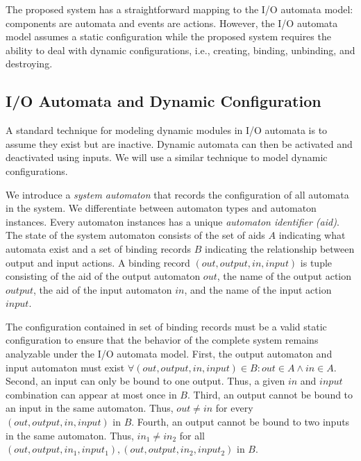 The proposed system has a straightforward mapping to the I/O automata model: components are automata and events are actions.
However, the I/O automata model assumes a static configuration while the proposed system requires the ability to deal with dynamic configurations, i.e., creating, binding, unbinding, and destroying.

\subsection{I/O Automata and Dynamic Configuration}

A standard technique for modeling dynamic modules in I/O automata is to assume they exist but are inactive.
Dynamic automata can then be activated and deactivated using inputs.
We will use a similar technique to model dynamic configurations.

We introduce a \emph{system automaton} that records the configuration of all automata in the system.
We differentiate between automaton types and automaton instances.
Every automaton instances has a unique \emph{automaton identifier (aid)}.
The state of the system automaton consists of the set of aids $A$ indicating what automata exist and a set of binding records $B$ indicating the relationship between output and input actions.
A binding record $(out, output, in, input)$ is tuple consisting of the aid of the output automaton $out$, the name of the output action $output$, the aid of the input automaton $in$, and the name of the input action $input$.

The configuration contained in set of binding records must be a valid static configuration to ensure that the behavior of the complete system remains analyzable under the I/O automata model.
First, the output automaton and input automaton must exist $\forall (out, output, in, input) \in B: out \in A \land in \in A$.
Second, an input can only be bound to one output.
Thus, a given $in$ and $input$ combination can appear at most once in $B$.
Third, an output cannot be bound to an input in the same automaton.
Thus, $out \neq in$ for every $(out, output, in, input)$ in $B$.
Fourth, an output cannot be bound to two inputs in the same automaton.
Thus, $in_1 \neq in_2$ for all $(out, output, in_1, input_1), (out, output, in_2, input_2)$ in $B$.

